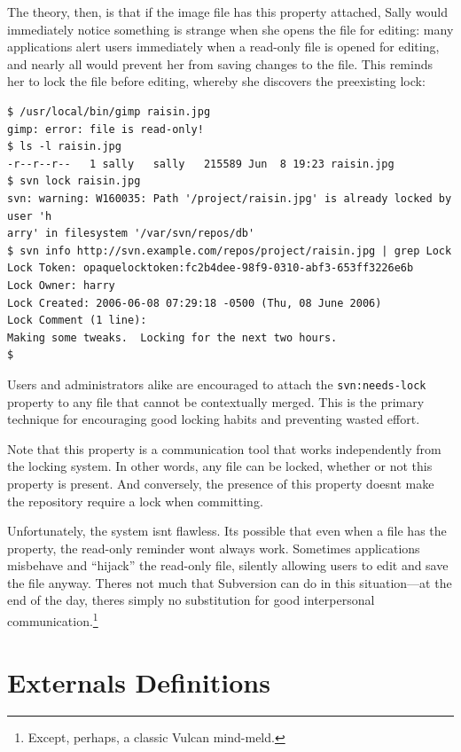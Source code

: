 The theory, then, is that if the image file has this property attached,
Sally would immediately notice something is strange when she opens the
file for editing: many applications alert users immediately when a
read-only file is opened for editing, and nearly all would prevent her
from saving changes to the file. This reminds her to lock the file
before editing, whereby she discovers the preexisting lock:

\begin{verbatim}
$ /usr/local/bin/gimp raisin.jpg
gimp: error: file is read-only!
$ ls -l raisin.jpg
-r--r--r--   1 sally   sally   215589 Jun  8 19:23 raisin.jpg
$ svn lock raisin.jpg
svn: warning: W160035: Path '/project/raisin.jpg' is already locked by user 'h
arry' in filesystem '/var/svn/repos/db'
$ svn info http://svn.example.com/repos/project/raisin.jpg | grep Lock
Lock Token: opaquelocktoken:fc2b4dee-98f9-0310-abf3-653ff3226e6b
Lock Owner: harry
Lock Created: 2006-06-08 07:29:18 -0500 (Thu, 08 June 2006)
Lock Comment (1 line):
Making some tweaks.  Locking for the next two hours.
$
\end{verbatim}

Users and administrators alike are encouraged to attach the
\texttt{svn:needs-lock} property to any file that cannot be contextually
merged. This is the primary technique for encouraging good locking
habits and preventing wasted effort.

Note that this property is a communication tool that works independently
from the locking system. In other words, any file can be locked, whether
or not this property is present. And conversely, the presence of this
property doesn\textquotesingle t make the repository require a lock when
committing.

Unfortunately, the system isn\textquotesingle t flawless.
It\textquotesingle s possible that even when a file has the property,
the read-only reminder won\textquotesingle t always work. Sometimes
applications misbehave and ``hijack'' the read-only file, silently
allowing users to edit and save the file anyway. There\textquotesingle s
not much that Subversion can do in this situation---at the end of the
day, there\textquotesingle s simply no substitution for good
interpersonal communication.\footnote{Except, perhaps, a classic Vulcan
  mind-meld.}

\section{Externals Definitions}\label{svn.advanced.externals}

